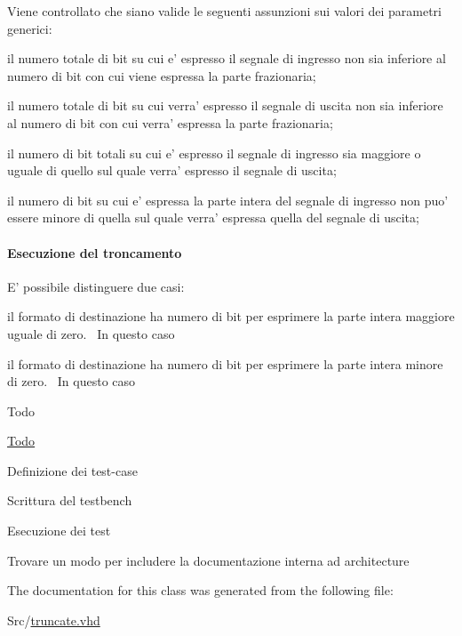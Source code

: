 Viene controllato che siano valide le seguenti assunzioni sui valori dei parametri generici\+:
\begin{DoxyItemize}
\item il numero totale di bit su cui e' espresso il segnale di ingresso non sia inferiore al numero di bit con cui viene espressa la parte frazionaria;
\item il numero totale di bit su cui verra' espresso il segnale di uscita non sia inferiore al numero di bit con cui verra' espressa la parte frazionaria;
\item il numero di bit totali su cui e' espresso il segnale di ingresso sia maggiore o uguale di quello sul quale verra' espresso il segnale di uscita;
\item il numero di bit su cui e' espressa la parte intera del segnale di ingresso non puo' essere minore di quella sul quale verra' espressa quella del segnale di uscita;
\end{DoxyItemize}

\paragraph*{Esecuzione del troncamento}

E' possibile distinguere due casi\+:
\begin{DoxyEnumerate}
\item il formato di destinazione ha numero di bit per esprimere la parte intera maggiore uguale di zero.~\newline
 In questo caso
\item il formato di destinazione ha numero di bit per esprimere la parte intera minore di zero.~\newline
 In questo caso
\end{DoxyEnumerate}

\begin{DoxyRefDesc}{Todo}
\item[\hyperlink{todo__todo000001}{Todo}]
\begin{DoxyItemize}
\item Definizione dei test-\/case
\item Scrittura del testbench
\item Esecuzione dei test
\item Trovare un modo per includere la documentazione interna ad architecture 
\end{DoxyItemize}\end{DoxyRefDesc}


The documentation for this class was generated from the following file\+:\begin{DoxyCompactItemize}
\item 
Src/\hyperlink{truncate_8vhd}{truncate.\+vhd}\end{DoxyCompactItemize}
